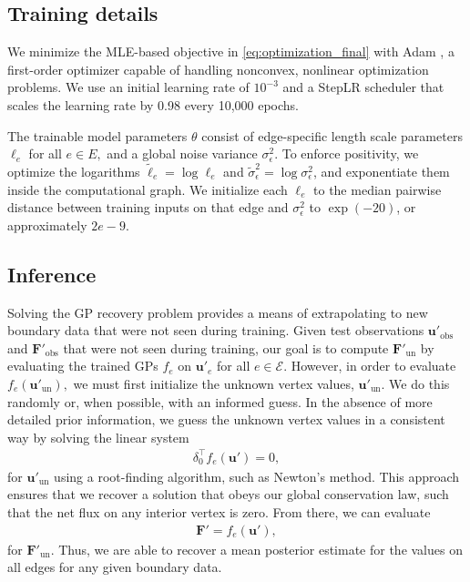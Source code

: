 \documentclass{article}
\theoremstyle{definition}
\theoremstyle{remark}
\begin{document}
\subsection{Training details}\label{sec:training}

We minimize the MLE-based objective in \eqref{eq:optimization_final} with Adam \cite{KingmaBa2014}, a first-order optimizer capable of handling nonconvex, nonlinear optimization problems. We use an initial learning rate of $10^{-3}$ and a StepLR scheduler that scales the learning rate by 0.98 every 10,000 epochs.

The trainable model parameters $\theta$ consist of edge-specific length scale parameters $\ell_e$ for all $e\in E,$ and a global noise variance $\sigma_{\epsilon}^2.$ To enforce positivity, we optimize the logarithms $\tilde{\ell}_e=\log{\ell_e}$ and $\tilde{\sigma}^2_{\epsilon}=\log{\sigma^2_{\epsilon}}$, and exponentiate them inside the computational graph. We initialize each $\ell_e$ to the median pairwise distance between training inputs on that edge and $\sigma_{\epsilon}^2$ to $\exp(-20)$, or approximately $2e-9$. 


\subsection{Inference}\label{sec:inference}

Solving the GP recovery problem provides a means of extrapolating to new boundary data that were not seen during training. Given test observations $\textbf{u}'_\text{obs}$ and $\mathbf{F}'_\text{obs}$ that were not seen during training, our goal is to compute $\mathbf{F}'_\text{un}$ by evaluating the trained GPs $f_e$ on $\mathbf{u}'_e$ for all $e\in\mathcal{E}$. However, in order to evaluate $f_e(\mathbf{u}'_\text{un}),$ we must first initialize the unknown vertex values, $\mathbf{u}'_\text{un}$. We do this randomly or, when possible, with an informed guess. In the absence of more detailed prior information, we guess the unknown vertex values in a consistent way by solving the linear system
\begin{align}\label{eq:extrapolate}
\delta_0^\intercal f_e(\mathbf{u}')=0,
\end{align}
for $\mathbf{u}'_\text{un}$ using a root-finding algorithm, such as Newton's method. This approach ensures that we recover a solution that obeys our global conservation law, such that the net flux on any interior vertex is zero. From there, we can evaluate
\begin{align}
    \mathbf{F}'=f_e(\mathbf{u}'),
\end{align}
for $\mathbf{F}'_\text{un}$. Thus, we are able to recover a mean posterior estimate for the values on all edges for any given boundary data.
\end{document}
